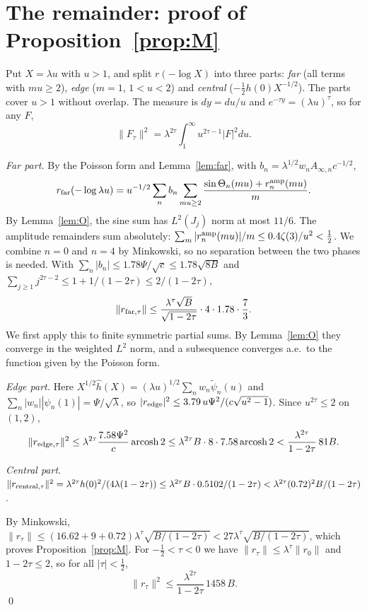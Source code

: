 \documentclass[11pt]{amsart}
\theoremstyle{remark}
\numberwithin{equation}{section}
\begin{document}
\section{The remainder: proof of Proposition~\ref{prop:M}}\label{sec:remainder}

Put $X=\lambda u$ with $u>1$, and split $r(-\log X)$ into three parts: \emph{far} (all terms with $mu\ge2$), \emph{edge} ($m=1$, $1<u<2$) and \emph{central} ($-\frac12h(0)X^{-1/2}$). The parts cover $u>1$ without overlap. The measure is $dy=du/u$ and $e^{-\tau y}=(\lambda u)^\tau$, so for any $F$,
\[
\|F_\tau\|^2=\lambda^{2\tau}\int_1^\infty u^{2\tau-1}|F|^2du .
\]

\emph{Far part.} By the Poisson form and Lemma~\ref{lem:far}, with $b_n=\lambda^{1/2}w_nA_{\infty,n}c^{-1/2}$,
\[
r_{\rm far}(-\log\lambda u)=u^{-1/2}\sum_nb_n\sum_{mu\ge2}\frac{\sin\Theta_n(mu)+r_n^{\rm amp}(mu)}m .
\]
By Lemma~\ref{lem:O}, the sine sum has $L^2(J_j)$ norm at most $11/6$. The amplitude remainders sum absolutely: $\sum_m|r^{\rm amp}_n(mu)|/m\le0.4\zeta(3)/u^2<\frac12$. We combine $n=0$ and $n=4$ by Minkowski, so no separation between the two phases is needed. With $\sum_n|b_n|\le1.78\Psi/\sqrt c\le1.78\sqrt{8B}$ and $\sum_{j\ge1}j^{2\tau-2}\le1+1/(1-2\tau)\le2/(1-2\tau)$,
\[
\|r_{{\rm far},\tau}\|\le\frac{\lambda^\tau\sqrt B}{\sqrt{1-2\tau}}\cdot4\cdot1.78\cdot\frac73 .
\]
We first apply this to finite symmetric partial sums. By Lemma~\ref{lem:O} they converge in the weighted $L^2$ norm, and a subsequence converges a.e.\ to the function given by the Poisson form.

\emph{Edge part.} Here $X^{1/2}\hat h(X)=(\lambda u)^{1/2}\sum_nw_n\tilde\psi_n(u)$ and $\sum_n|w_n||\psi_n(1)|=\Psi/\sqrt\lambda$, so $|r_{\rm edge}|^2\le3.79\,u\Psi^2/(c\sqrt{u^2-1})$. Since $u^{2\tau}\le2$ on $(1,2)$,
\[
\|r_{{\rm edge},\tau}\|^2\le\lambda^{2\tau}\frac{7.58\Psi^2}c\operatorname{arcosh}2\le\lambda^{2\tau}B\cdot8\cdot7.58\operatorname{arcosh}2<\frac{\lambda^{2\tau}}{1-2\tau}\,81B .
\]

\emph{Central part.} $\|r_{{\rm central},\tau}\|^2=\lambda^{2\tau}h(0)^2/(4\lambda(1-2\tau))\le\lambda^{2\tau}B\cdot0.5102/(1-2\tau)<\lambda^{2\tau}(0.72)^2B/(1-2\tau)$.

By Minkowski, $\|r_\tau\|\le(16.62+9+0.72)\lambda^\tau\sqrt{B/(1-2\tau)}<27\lambda^\tau\sqrt{B/(1-2\tau)}$, which proves Proposition~\ref{prop:M}. For $-\frac12<\tau<0$ we have $\|r_\tau\|\le\lambda^\tau\|r_0\|$ and $1-2\tau\le2$, so for all $|\tau|<\frac12$,
\begin{equation}\label{eq:1458}
\|r_\tau\|^2\le\frac{\lambda^{2\tau}}{1-2\tau}\,1458\,B .
\end{equation}
\qed
\end{document}
